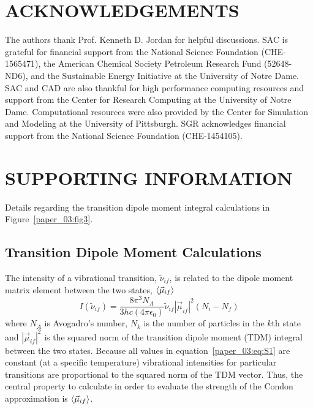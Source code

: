 \documentclass[%
  class = book,%
  crop = false,%
  float = true,%
  multi = true,%
  preview = false,%
]{standalone}
\newcommand{\caps}[1]{\uppercase{#1}}
\begin{document}
\section{\texorpdfstring{\caps{Acknowledgements}}{Acknowledgements}}

The authors thank Prof. Kenneth D. Jordan for helpful discussions. SAC is grateful for financial support from the National Science Foundation (CHE-1565471), the American Chemical Society Petroleum Research Fund (52648-ND6), and the Sustainable Energy Initiative at the University of Notre Dame. SAC and CAD are also thankful for high performance computing resources and support from the Center for Research Computing at the University of Notre Dame. Computational resources were also provided by the Center for Simulation and Modeling at the University of Pittsburgh. SGR acknowledges financial support from the National Science Foundation (CHE-1454105).

\section{\texorpdfstring{\caps{Supporting Information}}{Supporting Information}}
\label{paper_03:sec:SI}

Details regarding the transition dipole moment integral calculations in Figure~\ref{paper_03:fig3}.

\subsection{Transition Dipole Moment Calculations}

The intensity of a vibrational transition, \(\tilde{\nu}_{if}\), is related to the dipole moment matrix element between the two states, \(\Braket{\vec{\mu}_{if}}\)
\begin{equation}
  \label{paper_03:eq:S1}
  I \left( \tilde{\nu}_{if} \right) = \frac{8\pi^{3}N_{A}}{3hc\left( 4\pi\epsilon_{0} \right)} \tilde{\nu}_{if} \left| \vec{\mu}_{if} \right|^{2} (N_{i} - N_{f})
\end{equation}
where \(N_{A}\) is Avogadro's number, \(N_{k}\) is the number of particles in the \(k\)th state and \(\left| \vec{\mu}_{if} \right|^{2}\) is the squared norm of the transition dipole moment (TDM) integral between the two states.\cite{Carbonniere2010} Because all values in equation~\ref{paper_03:eq:S1} are constant (at a specific temperature) vibrational intensities for particular transitions are proportional to the squared norm of the TDM vector. Thus, the central property to calculate in order to evaluate the strength of the Condon approximation is \(\Braket{\vec{\mu}_{if}}\).
\end{document}
